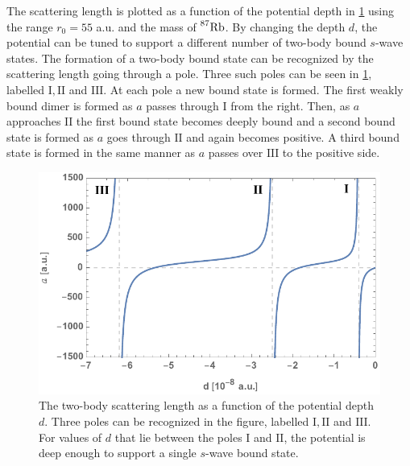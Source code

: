 The scattering length is plotted as a function of the potential depth in \cref{fig:res_1} using the range $r_0=55 $ a.u. and the mass of $ \prescript{87}{}{\mathrm{Rb}}$. By changing the depth $d$, the potential can be tuned to support a different number of two-body bound $s$-wave states. The formation of a two-body bound state can be recognized by the scattering length going through a pole. Three such poles can be seen in \cref{fig:res_1}, labelled $\mathrm{I},\mathrm{II}$ and $\mathrm{III}$. At each pole a new bound state is formed. The first weakly bound dimer is formed as $a$ passes through $\mathrm{I}$ from the right. Then, as $a$ approaches $\mathrm{II}$ the first bound state becomes deeply bound and a second bound state is formed as $a$ goes through $\mathrm{II}$ and again becomes positive. A third bound state is formed in the same manner as $a$ passes over $\mathrm{III}$ to the positive side.

\begin{figure}[b!]
	\includegraphics[width=\linewidth]{scatteringlength.pdf}
	\caption{The two-body scattering length as a function of the potential depth $d$. Three poles can be recognized in the figure, labelled $\mathrm{I},\mathrm{II}$ and $\mathrm{III}$. For values of $d$ that lie between the poles $\mathrm{I}$ and $\mathrm{II}$, the potential is deep enough to support a single $s$-wave bound state.}
	\label{fig:res_1}
\end{figure}
